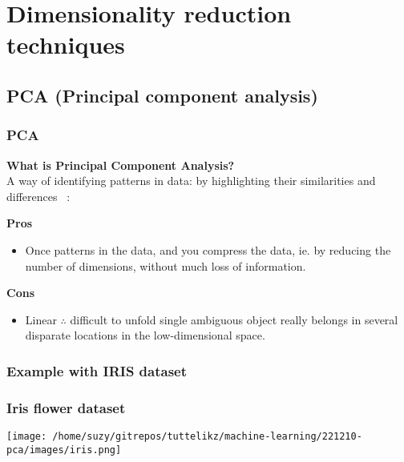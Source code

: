 \documentclass{beamer}
\begin{document}
    \section{Dimensionality reduction techniques}
    \subsection{PCA (Principal component analysis)}
    \begin{frame}
        \frametitle{PCA}
        
        \textbf{What is Principal Component Analysis?} \\
        A way of identifying patterns in data: by highlighting their similarities and differences ~\cite{smith2002tutorial}:
        
        \bigskip
        \textbf{Pros}
        \begin{itemize}
            \item Once patterns in the data, and you compress the data, ie. by reducing the number of dimensions, without much loss of information.
        \end{itemize}

        \textbf{Cons}
        \begin{itemize}
            \item Linear $\therefore$ difficult to unfold single ambiguous object really belongs in several disparate locations in the low-dimensional space.
        \end{itemize}
    \end{frame}


    \subsubsection{Example with IRIS dataset}
    \begin{frame}
        \frametitle{Iris flower dataset}
        \begin{center}
        \texttt{[image: /home/suzy/gitrepos/tuttelikz/machine-learning/221210-pca/images/iris.png]}
        \end{center}
    \end{frame}
    
\end{document}
